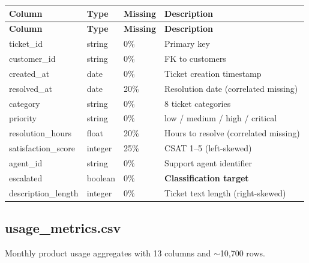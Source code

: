 \documentclass[11pt,a4paper]{article}
\begin{document}
\begin{center}
\begin{longtable}{lllp{5.5cm}}
    \toprule
    \textbf{Column} & \textbf{Type} & \textbf{Missing} & \textbf{Description} \\
    \midrule
    \endfirsthead
    \toprule
    \textbf{Column} & \textbf{Type} & \textbf{Missing} & \textbf{Description} \\
    \midrule
    \endhead
    ticket\_id           & string  & 0\%  & Primary key \\
    customer\_id         & string  & 0\%  & FK to customers \\
    created\_at          & date    & 0\%  & Ticket creation timestamp \\
    resolved\_at         & date    & 20\% & Resolution date (correlated missing) \\
    category             & string  & 0\%  & 8 ticket categories \\
    priority             & string  & 0\%  & low / medium / high / critical \\
    resolution\_hours    & float   & 20\% & Hours to resolve (correlated missing) \\
    satisfaction\_score  & integer & 25\% & CSAT 1--5 (left-skewed) \\
    agent\_id            & string  & 0\%  & Support agent identifier \\
    escalated            & boolean & 0\%  & \textbf{Classification target} \\
    description\_length  & integer & 0\%  & Ticket text length (right-skewed) \\
    \bottomrule
\end{longtable}
\end{center}

\subsection{usage\_metrics.csv}

Monthly product usage aggregates with 13 columns and $\sim$10,700 rows.
\end{document}
